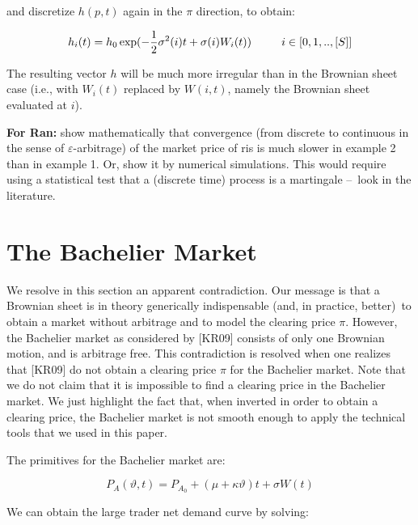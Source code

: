\documentclass{article}
\begin{document}
and discretize $h(p,t)$ again in the $\pi $ direction, to obtain:

\begin{equation*}
h_{i}(t)=h_{0}\exp (-\frac{1}{2}\sigma ^{2}(i)t+\sigma (i)W_{i}(t))\text{ \
\ \ \ \ }i\in \lbrack 0,1,..,[S]]
\end{equation*}%
\bigskip

The resulting vector $h$ will be much more irregular than in the Brownian
sheet case (i.e., with $W_{i}(t)$ replaced by $W(i,t)$, namely the Brownian
sheet evaluated at $i$).

\bigskip

\textbf{For Ran:} show mathematically that convergence (from discrete to
continuous in the sense of $\varepsilon $-arbitrage) of the market price of
ris is much slower in example 2 than in example 1. Or, show it by numerical
simulations. This would require using a statistical test that a (discrete
time) process is a martingale --\TEXTsymbol{>}\ look in the literature.

\bigskip

\section{The Bachelier Market}

We resolve in this section an apparent contradiction. Our message is that a
Brownian sheet is in theory generically indispensable (and, in practice,
better)\ to obtain a market without arbitrage and to model the clearing
price $\pi $. However, the Bachelier market as considered by [KR09] consists
of only one Brownian motion, and is arbitrage free. This contradiction is
resolved when one realizes that [KR09] do not obtain a clearing price $\pi $
for the Bachelier market. Note that we do not claim that it is impossible to
find a clearing price in the Bachelier market. We just highlight the fact
that, when inverted in order to obtain a clearing price, the Bachelier
market is not smooth enough to apply the technical tools that we used in
this paper.

\bigskip

The primitives for the Bachelier market are:

\begin{equation*}
P_{A}(\vartheta ,t)=P_{A_{0}}+\left( \mu +\kappa \vartheta \right) t+\sigma
W(t)
\end{equation*}

We can obtain the large trader net demand curve by solving:
\end{document}
